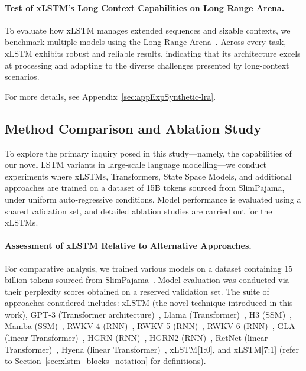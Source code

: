 \paragraph{Test of xLSTM's Long Context Capabilities on Long Range Arena.} To evaluate how xLSTM manages extended sequences and sizable contexts, we benchmark multiple models using the Long Range Arena~\citep{Tay:21}. Across every task, xLSTM exhibits robust and reliable results, indicating that its architecture excels at processing and adapting to the diverse challenges presented by long-context scenarios.

For more details, see Appendix~\ref{sec:appExpSynthetic-lra}.

\subsection{Method Comparison and Ablation Study}
\label{sec:ExpComparison}

To explore the primary inquiry posed in this study—namely, the capabilities of our novel LSTM variants in large-scale language modelling—we conduct experiments where xLSTMs, Transformers, State Space Models, and additional approaches are trained on a dataset of 15B tokens sourced from SlimPajama, under uniform auto-regressive conditions. Model performance is evaluated using a shared validation set, and detailed ablation studies are carried out for the xLSTMs.

\paragraph{Assessment of xLSTM Relative to Alternative Approaches.} For comparative analysis, we trained various models on a dataset containing 15 billion tokens sourced from SlimPajama~\citep{Soboleva:23}. Model evaluation was conducted via their perplexity scores obtained on a reserved validation set. The suite of approaches considered includes: xLSTM (the novel technique introduced in this work), GPT-3 (Transformer architecture)~\citep{Brown:20short}, Llama (Transformer)~\citep{Touvron:23arxiv}, H3 (SSM)~\citep{Fu:23}, Mamba (SSM)~\citep{Gu:24arxiv}, RWKV-4 (RNN)~\citep{Peng:23arxivshort}, RWKV-5 (RNN)~\citep{Peng:24arxivshort}, RWKV-6 (RNN)~\citep{Peng:24arxivshort}, GLA (linear Transformer)~\citep{Yang:23arxiv}, HGRN (RNN)~\citep{Qin:23}, HGRN2 (RNN)~\citep{Qin:24arxiv}, RetNet (linear Transformer)~\citep{Sun:23arxiv}, Hyena (linear Transformer)~\citep{Poli:23}, xLSTM[1:0], and xLSTM[7:1] (refer to Section~\ref{sec:xlstm_blocks_notation} for definitions). 

